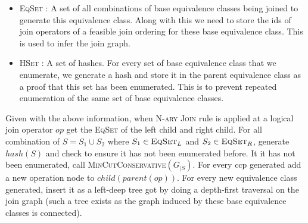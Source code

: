 \begin{itemize}
	\item \textsc{EqSet} : A set of all combinations of base equivalence classes being joined to generate this equivalence class. Along with this we need to store the ids of join operators of a feasible join ordering for these base equivalence class. This is used to infer the join graph.
	\item \textsc{HSet} : A set of hashes. For every set of base equivalence class that we enumerate, we generate a hash and store it in the parent equivalence class as a proof that this set has been enumerated. This is to prevent repeated enumeration of the same set of base equivalence classes.
\end{itemize}

Given with the above information, when \textsc{N-ary Join} rule is applied at a logical join operator $op$ get the \textsc{EqSet} of the left child and right child. For all combination of $S=S_{1} \cup S_{2}$ where $S_{1}\in \textsc{EqSet}_{L}$ and $S_{2}\in \textsc{EqSet}_{R}$, generate $hash(S)$ and check to ensure it has not been enumerated before. It it has not been enumerated, call \textsc{MinCutConservative}$(G_{|S})$. For every ccp generated add a new operation node to $child(parent(op))$. For every new equivalence class generated, insert it as a left-deep tree got by doing a depth-first traversal on the join graph (such a tree exists as the graph induced by these base equivalence classes is connected).
